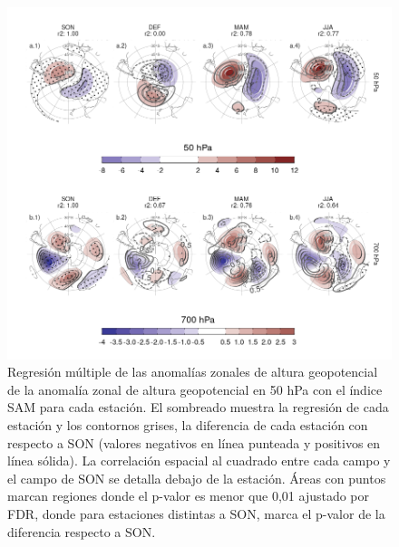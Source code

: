 \documentclass[12pt,oneside,a4paper]{reedthesis}
\begin{document}
\begin{figure}

{\centering \includegraphics{figures/30-sam/season-regression-1} 

}

\caption{Regresión múltiple de las anomalías zonales de altura geopotencial de la anomalía zonal de altura geopotencial en 50 hPa con el índice SAM para cada estación. El sombreado muestra la regresión de cada estación y los contornos grises, la diferencia de cada estación con respecto a SON (valores negativos en línea punteada y positivos en línea sólida). La correlación espacial al cuadrado entre cada campo y el campo de SON se detalla debajo de la estación. Áreas con puntos marcan regiones donde el p-valor es menor que 0,01 ajustado por FDR, donde para estaciones distintas a SON, marca el p-valor de la diferencia respecto a SON.}\label{fig:season-regression}
\end{figure}
\end{document}

